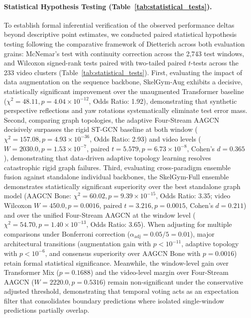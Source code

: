 \documentclass[runningheads]{llncs}
\begin{document}
\paragraph{Statistical Hypothesis Testing (Table~\ref{tab:statistical_tests}).} To establish formal inferential verification of the observed performance deltas beyond descriptive point estimates, we conducted paired statistical hypothesis testing following the comparative framework of Dietterich \cite{dietterich1998} across both evaluation grains: McNemar's test with continuity correction \cite{mcnemar1947} across the 2,743 test windows, and Wilcoxon signed-rank tests \cite{wilcoxon1945} paired with two-tailed paired $t$-tests across the 233 video clusters (Table~\ref{tab:statistical_tests}).
First, evaluating the impact of data augmentation on the sequence backbone, SkelGym-Aug exhibits a decisive, statistically significant improvement over the unaugmented Transformer baseline ($\chi^2 = 48.11, p = 4.04 \times 10^{-12}$, Odds Ratio: 1.92), demonstrating that synthetic perspective reflections and yaw rotations systematically eliminate test error mass.
Second, comparing graph topologies, the adaptive Four-Stream AAGCN decisively surpasses the rigid ST-GCN baseline at both window ($\chi^2 = 157.08, p = 4.93 \times 10^{-36}$, Odds Ratio: 2.93) and video levels ($W = 2030.0, p = 1.53 \times 10^{-7}$, paired $t = 5.579, p = 6.73 \times 10^{-8}$, Cohen's $d = 0.365$), demonstrating that data-driven adaptive topology learning resolves catastrophic rigid graph failures.
Third, evaluating cross-paradigm ensemble fusion against standalone individual backbones, the SkelGym-Full ensemble demonstrates statistically significant superiority over the best standalone graph model (AAGCN Bone: $\chi^2 = 60.02, p = 9.39 \times 10^{-15}$, Odds Ratio: 3.35; video Wilcoxon $W = 450.0, p = 0.0016$, paired $t = 3.216, p = 0.0015$, Cohen's $d = 0.211$) and over the unified Four-Stream AAGCN at the window level ($\chi^2 = 54.70, p = 1.40 \times 10^{-13}$, Odds Ratio: 3.65). When adjusting for multiple comparisons under Bonferroni correction ($\alpha_{\text{adj}} = 0.05 / 5 = 0.01$), major architectural transitions (augmentation gain with $p < 10^{-11}$, adaptive topology with $p < 10^{-6}$, and consensus superiority over AAGCN Bone with $p = 0.0016$) retain formal statistical significance. Meanwhile, the window-level gain over Transformer Mix ($p = 0.1688$) and the video-level margin over Four-Stream AAGCN ($W = 2220.0, p = 0.5316$) remain non-significant under the conservative adjusted threshold, demonstrating that temporal voting acts as an expectation filter that consolidates boundary predictions where isolated single-window predictions partially overlap.
\end{document}
